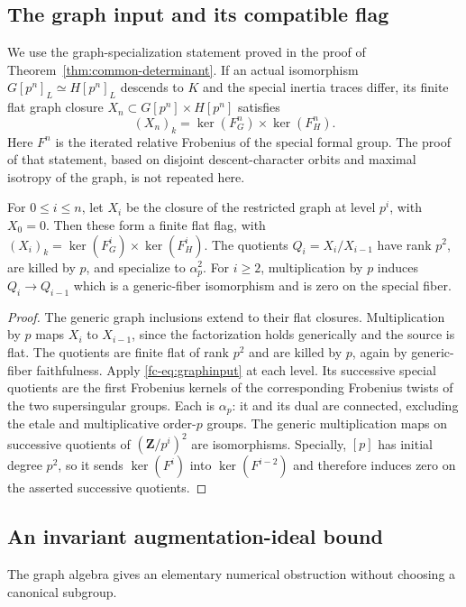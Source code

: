 \subsection{The graph input and its compatible flag}

We use the graph-specialization statement proved in the proof of Theorem~\ref{thm:common-determinant}.
If an actual isomorphism \(G[p^n]_L\simeq H[p^n]_L\) descends to \(K\)
and the special inertia traces differ, its finite flat graph closure
\(X_n\subset G[p^n]\times H[p^n]\) satisfies
\begin{equation}\label{fc-eq:graphinput}
 (X_n)_k=\ker(F_G^n)\times\ker(F_H^n).
\end{equation}
Here \(F^n\) is the iterated relative Frobenius of the special formal
group. The proof of that statement, based on disjoint descent-character
orbits and maximal isotropy of the graph, is not repeated here.

\begin{proposition}\label{fc-prop:flag}
For \(0\leq i\leq n\), let \(X_i\) be the closure of the restricted
graph at level \(p^i\), with \(X_0=0\). Then these form a finite flat
flag, with \((X_i)_k=\ker(F_G^i)\times\ker(F_H^i)\).
The quotients \(Q_i=X_i/X_{i-1}\) have rank \(p^2\), are killed by \(p\),
and specialize to \(\alpha_p^2\). For \(i\geq2\), multiplication by \(p\)
induces \(Q_i\to Q_{i-1}\) which is a generic-fiber isomorphism and is
zero on the special fiber.
\end{proposition}
\begin{proof}
The generic graph inclusions extend to their flat closures. Multiplication
by \(p\) maps \(X_i\) to \(X_{i-1}\), since the factorization holds
generically and the source is flat. The quotients are finite flat of rank
\(p^2\) and are killed by \(p\), again by generic-fiber faithfulness.
Apply \eqref{fc-eq:graphinput} at each level. Its successive special
quotients are the first Frobenius kernels of the corresponding Frobenius
twists of the two supersingular groups. Each is \(\alpha_p\): it and its
dual are connected, excluding the etale and multiplicative order-\(p\)
groups. The generic multiplication maps on successive quotients of
\((\mathbf Z/p^i)^2\) are isomorphisms. Specially, \([p]\) has initial
degree \(p^2\), so it sends \(\ker(F^i)\) into \(\ker(F^{i-2})\) and
therefore induces zero on the asserted successive quotients.
\end{proof}

\subsection{An invariant augmentation-ideal bound}
The graph algebra gives an elementary numerical obstruction without choosing a canonical subgroup.


